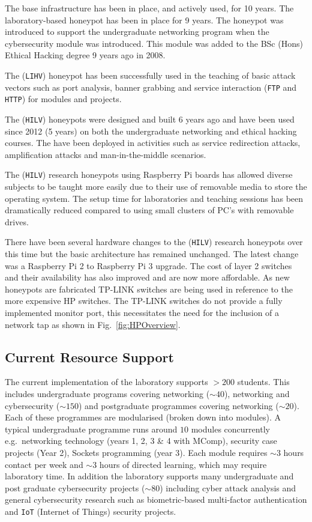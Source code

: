 \documentclass{llncs}
\begin{document}
The base infrastructure has been in place, and actively used, for 10 years. The
laboratory-based honeypot has been in place for 9 years. The honeypot was
introduced to support the undergraduate networking program when the
cybersecurity module was introduced. This module was added to the BSc (Hons)
Ethical Hacking degree 9 years ago in 2008.

The (\texttt{LIHV}) honeypot has been successfully used in the teaching of
basic attack vectors such as port analysis, banner grabbing and service
interaction (\texttt{FTP} and \texttt{HTTP}) for modules and projects.

The (\texttt{HILV}) honeypots were designed and built 6 years ago and have been
used since 2012 (5 years) on both the undergraduate networking and ethical
hacking courses. The have been deployed in activities such as service
redirection attacks, amplification attacks and man-in-the-middle scenarios.

The (\texttt{HILV}) research honeypots using Raspberry Pi boards has allowed
diverse subjects to be taught more easily due to their use of removable media
to store the operating system. The setup time for laboratories and teaching
sessions has been dramatically reduced compared to using small clusters of PC's
with removable drives.

There have been several hardware changes to the (\texttt{HILV}) research
honeypots over this time but the basic architecture has remained unchanged. The
latest change was a Raspberry Pi 2 to Raspberry Pi 3 upgrade. The cost of layer
2 switches and their availability has also improved and are now more
affordable. As new honeypots are fabricated TP-LINK switches are being used in
reference to the more expensive HP switches. The TP-LINK switches do not
provide a fully implemented monitor port, this necessitates the need for the
inclusion of a network tap as shown in Fig.~\ref{fig:HPOverview}.

\subsection{Current Resource Support\label{ResourceSupport}}

The current implementation of the laboratory supports $>200$ students. This
includes undergraduate programs covering networking ($\sim40$), networking and
cybersecurity ($\sim150$) and postgraduate programmes covering networking
($\sim20$). Each of these programmes are modularised (broken down into
modules).  A typical undergraduate programme runs around $10$ modules
concurrently e.g.\ networking technology (years 1, 2, 3 \& 4 with MComp),
security case projects (Year 2), Sockets programming (year 3). Each module
requires $\sim3$ hours contact per week and $\sim3$ hours of directed learning,
which may require laboratory time. In addition the laboratory supports many
undergraduate and post graduate cybersecurity projects ($\sim80$) including
cyber attack analysis and general cybersecurity research such as
biometric-based multi-factor authentication and \texttt{IoT} (Internet of
Things) security projects.
\end{document}
